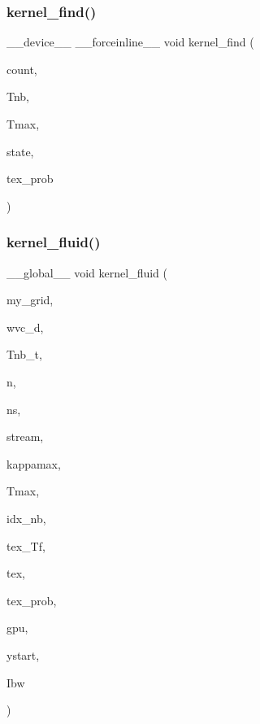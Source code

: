 \subsubsection{\texorpdfstring{kernel\+\_\+find()}{kernel\_find()}}
{\footnotesize\ttfamily \+\_\+\+\_\+device\+\_\+\+\_\+ \+\_\+\+\_\+forceinline\+\_\+\+\_\+ void kernel\+\_\+find (\begin{DoxyParamCaption}\item[{\hyperlink{classCount}{Count} $\ast$}]{count,  }\item[{\hyperlink{param_8h_a5f097c9f3873af7be7fc156e6a06ca5e}{myfloat} $\ast$}]{Tnb,  }\item[{\hyperlink{param_8h_a5f097c9f3873af7be7fc156e6a06ca5e}{myfloat}}]{Tmax,  }\item[{curand\+State\+\_\+t $\ast$}]{state,  }\item[{cuda\+Texture\+Object\+\_\+t $\ast$}]{tex\+\_\+prob }\end{DoxyParamCaption})}

\mbox{\label{mc__gpu_8cu_ad603ee98b5cd9e3d05deee64b1eceaa6}} 
\subsubsection{\texorpdfstring{kernel\+\_\+fluid()}{kernel\_fluid()}}
{\footnotesize\ttfamily \+\_\+\+\_\+global\+\_\+\+\_\+ void kernel\+\_\+fluid (\begin{DoxyParamCaption}\item[{\hyperlink{classGridn}{Gridn} $\ast$}]{my\+\_\+grid,  }\item[{\hyperlink{param_8h_a5f097c9f3873af7be7fc156e6a06ca5e}{myfloat} $\ast$}]{wvc\+\_\+d,  }\item[{\hyperlink{param_8h_a5f097c9f3873af7be7fc156e6a06ca5e}{myfloat} $\ast$}]{Tnb\+\_\+t,  }\item[{int}]{n,  }\item[{int}]{ns,  }\item[{int}]{stream,  }\item[{\hyperlink{param_8h_a5f097c9f3873af7be7fc156e6a06ca5e}{myfloat}}]{kappamax,  }\item[{\hyperlink{param_8h_a5f097c9f3873af7be7fc156e6a06ca5e}{myfloat}}]{Tmax,  }\item[{int $\ast$}]{idx\+\_\+nb,  }\item[{cuda\+Texture\+Object\+\_\+t $\ast$}]{tex\+\_\+\+Tf,  }\item[{cuda\+Texture\+Object\+\_\+t $\ast$}]{tex,  }\item[{cuda\+Texture\+Object\+\_\+t $\ast$}]{tex\+\_\+prob,  }\item[{int}]{gpu,  }\item[{int}]{ystart,  }\item[{\hyperlink{structEmissSpec}{Emiss\+Spec} $\ast$}]{Ibw }\end{DoxyParamCaption})}

